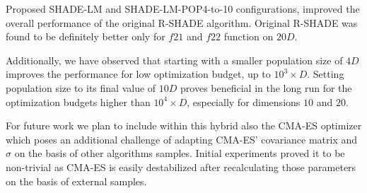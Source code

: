 \documentclass[sigconf]{acmart}
\begin{document}
Proposed SHADE-LM and SHADE-LM-POP4-to-10 configurations,
improved the overall performance of the original R-SHADE algorithm.
Original R-SHADE was found to be definitely better only for $f21$
and $f22$ function on $20D$.

Additionally, we have observed that starting with a smaller population size
of $4D$ improves the performance for low optimization budget,
up to $10^3 \times D$. Setting population size to its final value
of $10D$ proves beneficial in the long run for the optimization
budgets higher than $10^4 \times D$, especially for dimensions $10$
and $20$.

For future work we plan to include within this hybrid also the CMA-ES
optimizer which poses an additional challenge of adapting CMA-ES' covariance
matrix and $\sigma$ on the basis of other algorithms samples.
Initial experiments proved it to be non-trivial as CMA-ES is easily destabilized
after recalculating those parameters on the basis of external samples.


\end{document}
